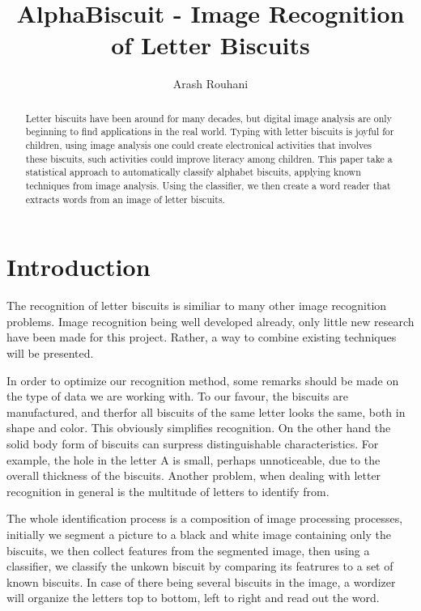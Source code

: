 \documentclass[a4paper,11pt]{article}
\title{AlphaBiscuit - Image Recognition of Letter Biscuits}
\author{Arash Rouhani}
\begin{document}
\maketitle

\begin{abstract}
    Letter biscuits have been around for many decades, but digital image
analysis are only beginning to find applications in the real world.
Typing with letter biscuits is joyful for children, using image analysis
one could create electronical activities that involves these biscuits,
such activities could improve literacy among children. This paper take
a statistical approach to automatically classify alphabet biscuits,
applying known techniques from image analysis. Using the classifier, we
then create a word reader that extracts words from an image of letter
biscuits.

\end{abstract}

\section{Introduction}
The recognition of letter biscuits is similiar to many other image recognition problems.
Image recognition being well developed already, only little new research have been made for this project.
Rather, a way to combine existing techniques will be presented.

In order to optimize our recognition method, some remarks should be made on the type of data we are working with.
To our favour, the biscuits are manufactured, and therfor all biscuits of the same letter looks the same, both in shape and color. This obviously simplifies recognition.
On the other hand the solid body form of biscuits can surpress distinguishable characteristics. For example, the hole in the letter A is small, perhaps unnoticeable, due to the overall thickness of the biscuits. Another problem, when dealing with letter recognition in general is the multitude of letters to identify from.

The whole identification process is a composition of image processing processes, 
initially we segment a picture to a black and white image containing only the biscuits, 
we then collect features from the segmented image, 
then using a classifier, we classify the unkown biscuit by comparing its featrures to a set of known biscuits.
In case of there being several biscuits in the image, a wordizer will organize the letters top to bottom, left to right and read out the word.
\end{document}

